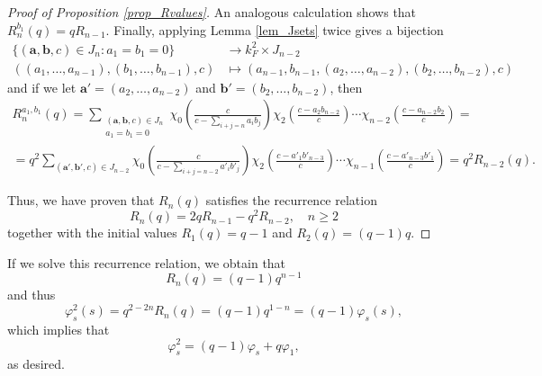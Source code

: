 \documentclass{article}
\theoremstyle{plain}
\theoremstyle{definition}
\begin{document}
\begin{proof}[Proof of Proposition \ref{prop_Rvalues}]
        An analogous calculation shows that $R_n^{b_1}(q)=qR_{n-1}$. Finally, applying Lemma \ref{lem_Jsets} twice gives a bijection 
        \begin{align*}
            \{(\mathbf{a},\mathbf{b},c)\in J_n:a_1=b_1=0\}&\longrightarrow k_F^2\times J_{n-2}\\
            ((a_1,\ldots,a_{n-1}),(b_1,\ldots,b_{n-1}),c)&\longmapsto (a_{n-1},b_{n-1},(a_2,\ldots,a_{n-2}),(b_2,\ldots,b_{n-2}),c)
        \end{align*}
        and if we let $\mathbf{a}'=(a_2,\ldots,a_{n-2})$ and $\mathbf{b}'=(b_2,\ldots,b_{n-2})$, then
        \begin{align*}
            R_n^{a_1,b_1}(q)=\sum_{\substack{(\mathbf{a},\mathbf{b},c)\in J_n\\ a_1=b_1=0}}\chi_0\left(\frac{c}{c-\sum_{i+j=n}a_ib_j}\right)\chi_2\left(\frac{c-a_2b_{n-2}}{c}\right)%
            \cdots\chi_{n-2}\left(\frac{c-a_{n-2}b_2}{c}\right)=\\
            =q^2\sum_{(\mathbf{a}',\mathbf{b}',c)\in J_{n-2}}\chi_0\left(\frac{c}{c-\sum_{i+j=n-2}a'_ib'_j}\right)\chi_2\left(\frac{c-a'_1b'_{n-3}}{c}\right)%
            \cdots\chi_{n-1}\left(\frac{c-a'_{n-3}b'_1}{c}\right)=q^2R_{n-2}(q).
        \end{align*}

        Thus, we have proven that $R_n(q)$ satisfies the recurrence relation 
        \begin{equation*}
            R_n(q)=2qR_{n-1}-q^2R_{n-2},\quad n\geq 2
        \end{equation*}
        together with the initial values $R_1(q)=q-1$ and $R_2(q)=(q-1)q$. 
    \end{proof}
    
    If we solve this recurrence relation, we obtain that 
    $$R_n(q)=(q-1)q^{n-1}$$
    and thus
    $$\varphi_s^2(s)=q^{2-2n}R_n(q)=(q-1)q^{1-n}=(q-1)\varphi_s(s),$$
    which implies that $$\varphi_s^2=(q-1)\varphi_s+q\varphi_1,$$
    as desired.
\end{document}
